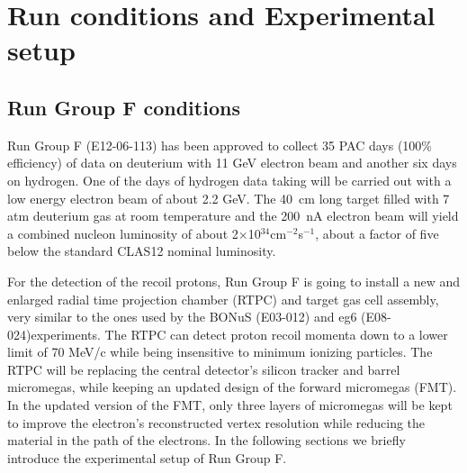 \chapter{Run conditions and Experimental setup}
\label{chap:physics}

\section{Run Group F conditions}

Run Group F (E12-06-113) has been approved to collect 35 PAC days (100\% 
efficiency) of data on deuterium with 11 GeV electron beam and another six days 
on hydrogen. One of the days of hydrogen data taking will be carried out with a 
low energy electron beam of about 2.2 GeV. The 40~cm long target filled with 7 
atm deuterium gas at room temperature and the 200~nA electron beam will yield a 
combined nucleon luminosity of about 2$\times$10$^{34}$cm$^{-2}$s$^{-1}$, about 
a factor of five below the standard CLAS12 nominal luminosity.

For the detection of the recoil protons, Run Group F is going to install a new 
and enlarged radial time projection chamber (RTPC) and target gas cell 
assembly, very similar to the ones used by the BONuS (E03-012) and eg6 
(E08-024)experiments. The RTPC can detect proton recoil momenta down to a lower 
limit of 70 MeV/c while being insensitive to minimum ionizing particles. The 
RTPC will be replacing the central detector's silicon tracker
and barrel micromegas, while keeping an updated design of the forward 
micromegas (FMT). In the updated version of the FMT, only three layers of 
micromegas will be kept to improve the electron's reconstructed vertex 
resolution while reducing the material in the path of the electrons. In the 
following sections we briefly introduce the experimental setup of Run Group F. 


